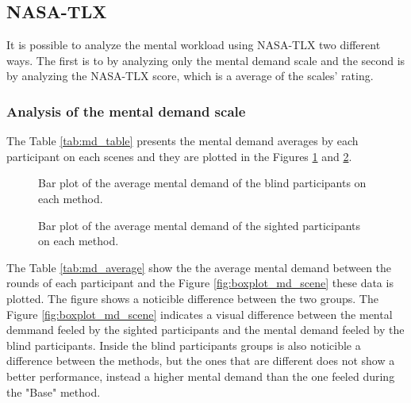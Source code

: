 \subsection{NASA-TLX}
\label{subsec:results_nasa_tlx}

It is possible to analyze the mental workload using NASA-TLX two different ways. The first is to by analyzing only the mental demand scale and the second is by analyzing the NASA-TLX score, which is a average of the scales' rating.

\subsubsection{Analysis of the mental demand scale}

The Table \ref{tab:md_table} presents the mental demand averages by each participant on each scenes and they are plotted in the Figures \ref{fig:barplot_md_scene_blind} and \ref{fig:barplot_md_scene_sight}.



\begin{figure}[!htb]
    \centering
    \resizebox{0.6\linewidth}{!}{
        
    }
    \caption{Bar plot of the average mental demand of the blind participants on each method.}
    \label{fig:barplot_md_scene_blind}
\end{figure}

\begin{figure}[!htb]
    \centering
    \resizebox{0.6\linewidth}{!}{
        
    }
    \caption{Bar plot of the average mental demand of the sighted participants on each method.}
    \label{fig:barplot_md_scene_sight}
\end{figure}

The Table \ref{tab:md_average} show the the average mental demand between the rounds of each participant and the Figure \ref{fig:boxplot_md_scene} these data is plotted. The figure shows a noticible difference between the two groups.  The Figure \ref{fig:boxplot_md_scene} indicates a visual difference between the mental demmand feeled by the sighted participants and the mental demand feeled by the blind participants. Inside the blind participants groups is also noticible a difference between the methods, but the ones that are different does not show a better performance, instead a higher mental demand than the one feeled during the "Base" method.

